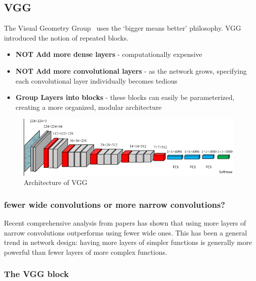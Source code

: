 \documentclass[11pt]{article}
\begin{document}


\subsection{VGG}

The Visual Geometry Group~\cite{VGG} uses the `bigger means better' philosophy. VGG introduced the notion of repeated blocks.

\begin{itemize}
    \item \textbf{NOT Add more dense layers} - computationally expensive
    \item \textbf{NOT Add more convolutional layers} - as the network grows, specifying each convolutional layer individually becomes tedious
    \item \textbf{Group Layers into blocks} - these blocks can easily be parameterized, creating a more organized, modular architecture
\end{itemize}

\begin{figure}[H]
    \centering
    \includegraphics[width=\linewidth]{figures/VGGFigure.png}
    \caption{Architecture of VGG}
\end{figure}



\subsubsection{fewer wide convolutions or more narrow convolutions?}

Recent comprehensive analysis from papers has shown that using more layers of narrow convolutions outperforms using fewer wide ones. This has been a general trend in network design: having more layers of simpler functions is generally more powerful than fewer layers of more complex functions. 

\subsubsection{The VGG block}
\end{document}
